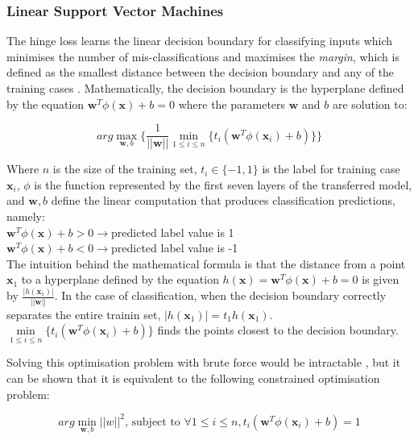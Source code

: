\documentclass[a4paper,11pt]{article}
\begin{document}
\subsubsection{Linear Support Vector Machines}

The hinge loss learns the linear decision boundary for classifying inputs which minimises the number of mis-classifications and maximises the \textit{margin}, which is defined as the smallest distance between the decision boundary and any of the training cases \cite{ML-book}. Mathematically, the decision boundary is the hyperplane defined by the equation $\textbf{w}^T \phi(\textbf{x}) + b = 0$ where the parameters $\textbf{w}$ and $b$ are solution to:

\begin{equation}
arg\max\limits_{\textbf{w},b}\{\frac{1}{||\textbf{w}||} \min\limits_{1 \leq i \leq n}\{t_i (\textbf{w}^T \phi(\textbf{x}_i)+b)\}\}
\end{equation}

Where $n$ is the size of the training set, $t_i \in \{-1,1\}$ is the label for training case $\textbf{x}_i$, $\phi$ is the function represented by the first seven layers of the transferred model, and $\textbf{w},b$ define the linear computation that produces classification predictions, namely: \\

$\textbf{w}^T \phi(\textbf{x}) + b > 0 \rightarrow $predicted label value is 1 \\
$\textbf{w}^T \phi(\textbf{x}) + b < 0 \rightarrow $predicted label value is -1 \\

The intuition behind the mathematical formula is that the distance from a point $\textbf{x}_1$ to a hyperplane defined by the equation $h(\textbf{x}) = \textbf{w}^T \phi(\textbf{x}) + b = 0$ is given by $\frac{|h(\textbf{x}_1)|}{||\textbf{w}||}$. In the case of classification, when the decision boundary correctly separates the entire trainin set, $|h(\textbf{x}_1)| = t_1 h(\textbf{x}_1)$. $\min\limits_{1 \leq i \leq n}\{t_i (\textbf{w}^T \phi(\textbf{x}_i)+b)\}$ finds the points closest to the decision boundary. 

Solving this optimisation problem with brute force would be intractable \cite{ML-book}, but it can be shown that it is equivalent to the following constrained optimisation problem:

\begin{equation}
arg\min \limits_{\textbf{w},b} ||w||^2 \text{, subject to } \forall 1 \leq i \leq n, t_i(\textbf{w}^T \phi(\textbf{x}_i)+b) = 1
\end{equation}
\end{document}
